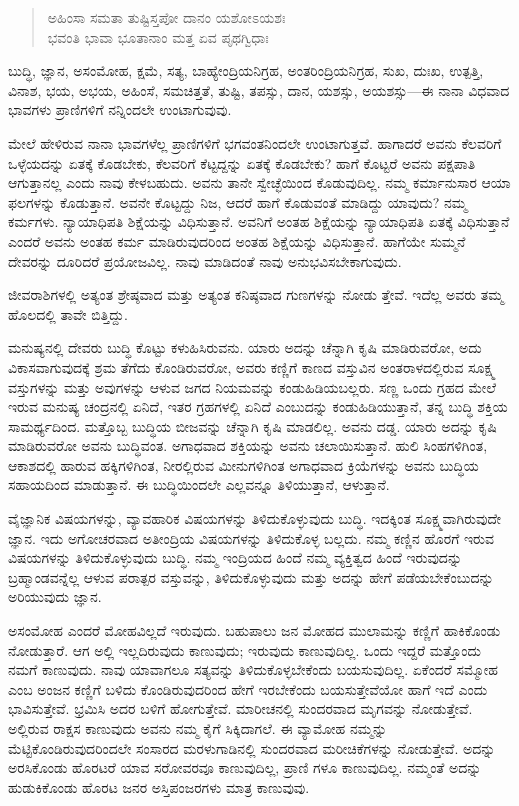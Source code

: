 \begin{verse}
ಅಹಿಂಸಾ ಸಮತಾ ತುಷ್ಟಿಸ್ತಪೋ ದಾನಂ ಯಶೋಽಯಶಃ\\ಭವಂತಿ ಭಾವಾ ಭೂತಾನಾಂ ಮತ್ತ ಏವ ಪೃಥಗ್ವಿಧಾಃ 
\end{verse}

{\small ಬುದ್ಧಿ, ಜ್ಞಾನ, ಅಸಂಮೋಹ, ಕ್ಷಮೆ, ಸತ್ಯ, ಬಾಹ್ಯೇಂದ್ರಿಯನಿಗ್ರಹ, ಅಂತರಿಂದ್ರಿಯನಿಗ್ರಹ, ಸುಖ, ದುಃಖ, ಉತ್ಪತ್ತಿ, ವಿನಾಶ, ಭಯ, ಅಭಯ, ಅಹಿಂಸೆ, ಸಮಚಿತ್ತತೆ, ತುಷ್ಟಿ, ತಪಸ್ಸು, ದಾನ, ಯಶಸ್ಸು, ಅಯಶಸ್ಸು—ಈ ನಾನಾ ವಿಧವಾದ ಭಾವಗಳು ಪ್ರಾಣಿಗಳಿಗೆ ನನ್ನಿಂದಲೇ ಉಂಟಾಗುವುವು.}

ಮೇಲೆ ಹೇಳಿರುವ ನಾನಾ ಭಾವಗಳೆಲ್ಲ ಪ್ರಾಣಿಗಳಿಗೆ ಭಗವಂತನಿಂದಲೇ ಉಂಟಾಗುತ್ತವೆ. ಹಾಗಾದರೆ ಅವನು ಕೆಲವರಿಗೆ ಒಳ್ಳೆಯದನ್ನು ಏತಕ್ಕೆ ಕೊಡಬೇಕು, ಕೆಲವರಿಗೆ ಕೆಟ್ಟದ್ದನ್ನು ಏತಕ್ಕೆ ಕೊಡಬೇಕು? ಹಾಗೆ ಕೊಟ್ಟರೆ ಅವನು ಪಕ್ಷಪಾತಿ ಆಗುತ್ತಾನಲ್ಲ ಎಂದು ನಾವು ಕೇಳಬಹುದು. ಅವನು ತಾನೇ ಸ್ವೇಚ್ಛೆಯಿಂದ ಕೊಡುವುದಿಲ್ಲ. ನಮ್ಮ ಕರ್ಮಾನುಸಾರ ಆಯಾ ಫಲಗಳನ್ನು ಕೊಡುತ್ತಾನೆ. ಅವನೇ ಕೊಟ್ಟದ್ದು ನಿಜ, ಆದರೆ ಹಾಗೆ ಕೊಡುವಂತೆ ಮಾಡಿದ್ದು ಯಾವುದು? ನಮ್ಮ ಕರ್ಮಗಳು. ನ್ಯಾಯಾಧಿಪತಿ ಶಿಕ್ಷೆಯನ್ನು ವಿಧಿಸುತ್ತಾನೆ. ಅವನಿಗೆ ಅಂತಹ ಶಿಕ್ಷೆಯನ್ನು ನ್ಯಾಯಾಧಿಪತಿ ಏತಕ್ಕೆ ವಿಧಿಸುತ್ತಾನೆ ಎಂದರೆ ಅವನು ಅಂತಹ ಕರ್ಮ ಮಾಡಿರುವುದರಿಂದ ಅಂತಹ ಶಿಕ್ಷೆಯನ್ನು ವಿಧಿಸುತ್ತಾನೆ. ಹಾಗೆಯೇ ಸುಮ್ಮನೆ ದೇವರನ್ನು ದೂರಿದರೆ ಪ್ರಯೋಜವಿಲ್ಲ. ನಾವು ಮಾಡಿದಂತೆ ನಾವು ಅನುಭವಿಸಬೇಕಾಗುವುದು.

ಜೀವರಾಶಿಗಳಲ್ಲಿ ಅತ್ಯಂತ ಶ್ರೇಷ್ಠವಾದ ಮತ್ತು ಅತ್ಯಂತ ಕನಿಷ್ಠವಾದ ಗುಣಗಳನ್ನು ನೋಡು ತ್ತೇವೆ. ಇದೆಲ್ಲ ಅವರು ತಮ್ಮ ಹೊಲದಲ್ಲಿ ತಾವೇ ಬಿತ್ತಿದ್ದು.

ಮನುಷ್ಯನಲ್ಲಿ ದೇವರು ಬುದ್ಧಿ ಕೊಟ್ಟು ಕಳುಹಿಸಿರುವನು. ಯಾರು ಅದನ್ನು ಚೆನ್ನಾಗಿ ಕೃಷಿ ಮಾಡಿರುವರೋ, ಅದು ವಿಕಾಸವಾಗುವುದಕ್ಕೆ ಶ್ರಮ ತೆಗೆದು ಕೊಂಡಿರುವರೋ, ಅವರು ಕಣ್ಣಿಗೆ ಕಾಣದ ವಸ್ತುವಿನ ಅಂತರಾಳದಲ್ಲಿರುವ ಸೂಕ್ಷ್ಮ ವಸ್ತುಗಳನ್ನು ಮತ್ತು ಅವುಗಳನ್ನು ಆಳುವ ಜಗದ ನಿಯಮವನ್ನು ಕಂಡುಹಿಡಿಯಬಲ್ಲರು. ಸಣ್ಣ ಒಂದು ಗ್ರಹದ ಮೇಲೆ ಇರುವ ಮನುಷ್ಯ ಚಂದ್ರನಲ್ಲಿ ಏನಿದೆ, ಇತರ ಗ್ರಹಗಳಲ್ಲಿ ಏನಿದೆ ಎಂಬುದನ್ನು ಕಂಡುಹಿಡಿಯುತ್ತಾನೆ, ತನ್ನ ಬುದ್ಧಿ ಶಕ್ತಿಯ ಸಾಮರ್ಥ್ಯದಿಂದ. ಮತ್ತೊಬ್ಬ ಬುದ್ಧಿಯ ಬೀಜವನ್ನು ಚೆನ್ನಾಗಿ ಕೃಷಿ ಮಾಡಲಿಲ್ಲ. ಅವನು ದಡ್ಡ. ಯಾರು ಅದನ್ನು ಕೃಷಿ ಮಾಡಿರುವರೋ ಅವನು ಬುದ್ಧಿವಂತ. ಅಗಾಧವಾದ ಶಕ್ತಿಯನ್ನು ಅವನು ಚಲಾಯಿಸುತ್ತಾನೆ. ಹುಲಿ ಸಿಂಹಗಳಿಗಿಂತ, ಆಕಾಶದಲ್ಲಿ ಹಾರುವ ಹಕ್ಕಿಗಳಿಗಿಂತ, ನೀರಲ್ಲಿರುವ ಮೀನುಗಳಿಗಿಂತ ಅಗಾಧವಾದ ಕ್ರಿಯೆಗಳನ್ನು ಅವನು ಬುದ್ಧಿಯ ಸಹಾಯದಿಂದ ಮಾಡುತ್ತಾನೆ. ಈ ಬುದ್ಧಿಯಿಂದಲೇ ಎಲ್ಲವನ್ನೂ ತಿಳಿಯುತ್ತಾನೆ, ಆಳುತ್ತಾನೆ.

ವೈಜ್ಞಾನಿಕ ವಿಷಯಗಳನ್ನು, ವ್ಯಾವಹಾರಿಕ ವಿಷಯಗಳನ್ನು ತಿಳಿದುಕೊಳ್ಳುವುದು ಬುದ್ಧಿ. ಇದಕ್ಕಿಂತ ಸೂಕ್ಷ್ಮವಾಗಿರುವುದೇ ಜ್ಞಾನ. ಇದು ಅಗೋಚರವಾದ ಅತೀಂದ್ರಿಯ ವಿಷಯಗಳನ್ನು ತಿಳಿದುಕೊಳ್ಳ ಬಲ್ಲದು. ನಮ್ಮ ಕಣ್ಣಿನ ಹೊರಗೆ ಇರುವ ವಿಷಯಗಳನ್ನು ತಿಳಿದುಕೊಳ್ಳುವುದು ಬುದ್ಧಿ. ನಮ್ಮ ಇಂದ್ರಿಯದ ಹಿಂದೆ ನಮ್ಮ ವ್ಯಕ್ತಿತ್ವದ ಹಿಂದೆ ಇರುವುದನ್ನು ಬ್ರಹ್ಮಾಂಡವನ್ನೆಲ್ಲ ಆಳುವ ಪರಾತ್ಪರ ವಸ್ತುವನ್ನು, ತಿಳಿದುಕೊಳ್ಳುವುದು ಮತ್ತು ಅದನ್ನು ಹೇಗೆ ಪಡೆಯಬೇಕೆಂಬುದನ್ನು ಅರಿಯುವುದು ಜ್ಞಾನ.

ಅಸಂಮೋಹ ಎಂದರೆ ಮೋಹವಿಲ್ಲದೆ ಇರುವುದು. ಬಹುಪಾಲು ಜನ ಮೋಹದ ಮುಲಾಮನ್ನು ಕಣ್ಣಿಗೆ ಹಾಕಿಕೊಂಡು ನೋಡುತ್ತಾರೆ. ಆಗ ಅಲ್ಲಿ ಇಲ್ಲದಿರುವುದು ಕಾಣುವುದು; ಇರುವುದು ಕಾಣುವುದಿಲ್ಲ. ಒಂದು ಇದ್ದರೆ ಮತ್ತೊಂದು ನಮಗೆ ಕಾಣುವುದು. ನಾವು ಯಾವಾಗಲೂ ಸತ್ಯವನ್ನು ತಿಳಿದುಕೊಳ್ಳಬೇಕೆಂದು ಬಯಸುವುದಿಲ್ಲ. ಏಕೆಂದರೆ ಸಮ್ಮೋಹ ಎಂಬ ಅಂಜನ ಕಣ್ಣಿಗೆ ಬಳಿದು ಕೊಂಡಿರುವುದರಿಂದ ಹೇಗೆ ಇರಬೇಕೆಂದು ಬಯಸುತ್ತೇವೆಯೋ ಹಾಗೆ ಇದೆ ಎಂದು ಭಾವಿಸುತ್ತೇವೆ. ಭ್ರಮಿಸಿ ಅದರ ಬಳಿಗೆ ಹೋಗುತ್ತೇವೆ. ಮಾರೀಚನಲ್ಲಿ ಸುಂದರವಾದ ಮೃಗವನ್ನು ನೋಡುತ್ತೇವೆ. ಅಲ್ಲಿರುವ ರಾಕ್ಷಸ ಕಾಣುವುದು ಅವನು ನಮ್ಮ ಕೈಗೆ ಸಿಕ್ಕಿದಾಗಲೆ. ಈ ವ್ಯಾಮೋಹ ನಮ್ಮನ್ನು ಮೆಟ್ಟಿಕೊಂಡಿರುವುದರಿಂದಲೇ ಸಂಸಾರದ ಮರಳುಗಾಡಿನಲ್ಲಿ ಸುಂದರವಾದ ಮರೀಚಿಕೆಗಳನ್ನು ನೋಡುತ್ತೇವೆ. ಅದನ್ನು ಅರಸಿಕೊಂಡು ಹೊರಟರೆ ಯಾವ ಸರೋವರವೂ ಕಾಣುವುದಿಲ್ಲ, ಪ್ರಾಣಿ ಗಳೂ ಕಾಣುವುದಿಲ್ಲ. ನಮ್ಮಂತೆ ಅದನ್ನು ಹುಡುಕಿಕೊಂಡು ಹೊರಟ ಜನರ ಅಸ್ತಿಪಂಜರಗಳು ಮಾತ್ರ ಕಾಣುವುವು.


